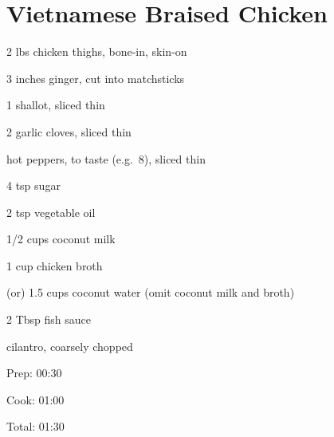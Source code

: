 \documentclass[oneside]{book}  %
\def\thisrecipe{}  %
\newcommand{\recipe}[1]{\section{#1}\def\thisrecipe{: #1}} %
\newcommand{\itemNL}{\item[] \hspace{-\labelsep}}  %
\begin{document}
\todo[Tomatoes and red cabbage?]
\recipe{Vietnamese Braised Chicken} \label{recipe:vietnamese_braised_chicken} %

\begin{IT}
  \begin{ingredients}
    \item[2 lbs] chicken thighs, bone-in, skin-on
    \item[3 inches] ginger, cut into matchsticks
    \item[1] shallot, sliced thin
    \item[2] garlic cloves, sliced thin
    \itemNL hot peppers, to taste (e.g.\ 8), sliced thin
    \item[4 tsp] sugar
    \item[2 tsp] vegetable oil
    \item[1/2 cups] coconut milk
    \item[1 cup] chicken broth
    \item[(or) 1.5 cups] coconut water (omit coconut milk and broth)
    \item[2 Tbsp] fish sauce
    \itemNL cilantro, coarsely chopped
  \end{ingredients}

  \switchcolumn

  \begin{timeline}
    \item[Prep:]  00:30
    \item[Cook:]  01:00
    \item[Total:] 01:30
  \end{timeline}
\end{IT}
\end{document}

